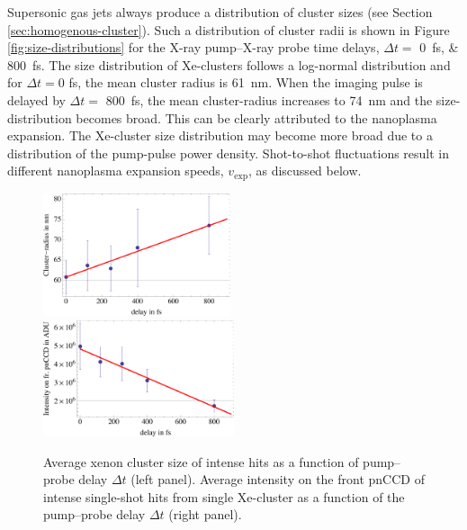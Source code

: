 Supersonic gas jets always produce a distribution of cluster sizes (see Section \ref{sec:homogenous-cluster}). Such a distribution of cluster radii is shown in Figure \ref{fig:size-distributions} for the X-ray pump--X-ray probe time delays, $\Delta t =$ \SIlist{0;800}{\femto\second}. The size distribution of Xe-clusters follows a log-normal distribution \citep{Schutte-2002-IJMS} and for $\Delta t=0$ fs, the mean cluster radius is \SI{61}{\nano\meter}. When the imaging pulse is delayed by $\Delta t=$ \SI{800}{\femto\second}, the mean cluster-radius increases to \SI{74}{\nano\meter} and the size-distribution becomes broad. This can be clearly attributed to the nanoplasma expansion. The Xe-cluster size distribution may become more broad due to a distribution of the pump-pulse power density. Shot-to-shot fluctuations result in different nanoplasma expansion speeds, $v_{\text{exp}}$, as discussed below.\\[1\baselineskip]
%
\begin{figure}
	\centering
		\includegraphics[width=0.49\textwidth]{images/results/filter-size.png}
		\includegraphics[width=0.50\textwidth]{images/results/filter-sum-frontpnCCD.png}
	\caption[Average cluster size correlated to measured intensity on front pnCCD.]{Average xenon cluster size of intense hits as a function of pump--probe delay $\Delta t$ (left panel). Average intensity on the front pnCCD of intense single-shot hits from single Xe-cluster as a function of the pump--probe delay $\Delta t$ (right panel).}
	\label{fig:filter-size-intensity}
\end{figure}
%
